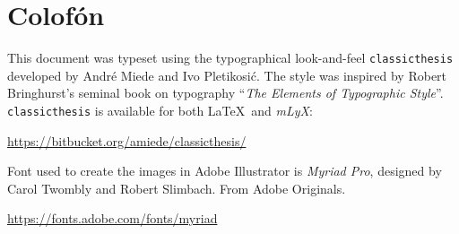 \pagestyle{empty}

\hfill

\vfill


\section*{Colofón}
This document was typeset using the typographical look-and-feel \texttt{classicthesis} developed by Andr\'e Miede and Ivo Pletikosić.
The style was inspired by Robert Bringhurst's seminal book on typography ``\emph{The Elements of Typographic Style}''.
\texttt{classicthesis} is available for both \LaTeX\ and \textit{mLyX}:
\begin{center}
\url{https://bitbucket.org/amiede/classicthesis/}
\end{center}

Font used to create the images in Adobe Illustrator is \textit{Myriad Pro}, designed by Carol Twombly and Robert Slimbach. From Adobe Originals.
\begin{center}
    \url{https://fonts.adobe.com/fonts/myriad}
\end{center}

\bigskip

\noindent